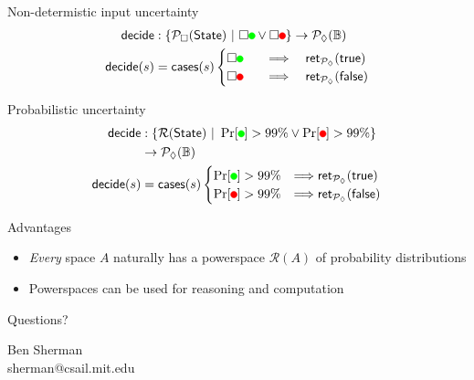 \documentclass[14pt, notes]{beamer}
\newcommand{\PLower}{\mathcal{P}_\lozenge}
\newcommand{\PUpper}{\mathcal{P}_\square}
\newcommand{\Prob}{\mathcal{R}}
\newcommand{\State}{\mathsf{State}}
\newcommand{\suchthat}{\ |\ }
\newcommand{\bool}{\mathbb{B}}
\newcommand{\ret}[1]{\mathsf{ret}_{#1}}
\newcommand*{\tikzbullet}[2]{%
  \setbox0=\hbox{\strut}%
  \begin{tikzpicture}
    \useasboundingbox (-.25em,0) rectangle (.25em,\ht0);
    \filldraw[draw=#1,fill=#2] (0,0.3\ht0) circle[radius=.25em];
  \end{tikzpicture}%
}
\newcommand{\SafeToGo}{\tikzbullet{green}{green}}
\newcommand{\SafeToStop}{\tikzbullet{red}{red}}
\begin{document}
\begin{frame}{Non-determistic input uncertainty}
\begin{align*}
\mathsf{decide} &: \{ \PUpper(\State) \suchthat \square \SafeToGo \vee \square \SafeToStop \} \to \PLower(\bool)
\\ \mathsf{decide}(s) &= \mathsf{cases}(s)
\begin{cases}
\square \SafeToGo
  \quad &\Longrightarrow \quad
  \ret{\PLower}(\mathsf{true})
\\
\square \SafeToStop
  \quad &\Longrightarrow \quad
  \ret{\PLower}(\mathsf{false})
\end{cases}
\end{align*}
\end{frame}

\begin{frame}{Probabilistic uncertainty}
\begin{align*}
\mathsf{decide} &: \{ \Prob(\State) \suchthat \Pr[\SafeToGo] > 99\% \vee \Pr[\SafeToStop] > 99\% \} 
\\ &\to \PLower(\bool)
\\ \mathsf{decide}(s) &= \mathsf{cases}(s)
\begin{cases}
\Pr[\SafeToGo] > 99\%
   &\Longrightarrow
  \ret{\PLower}(\mathsf{true})
\\
\Pr[\SafeToStop] > 99\%
   &\Longrightarrow
  \ret{\PLower}(\mathsf{false})
\end{cases}
\end{align*}
\end{frame}

\begin{frame}{Advantages}
\begin{itemize}
\item \emph{Every} space $A$ naturally has a powerspace $\Prob(A)$ of probability distributions
\item Powerspaces can be used for reasoning and computation
\end{itemize}
\end{frame}

\begin{frame}
\begin{center}
\Huge Questions?

\vspace{3em}

\small Ben Sherman
\\ sherman@csail.mit.edu
\end{center}
\end{frame}
\end{document}
